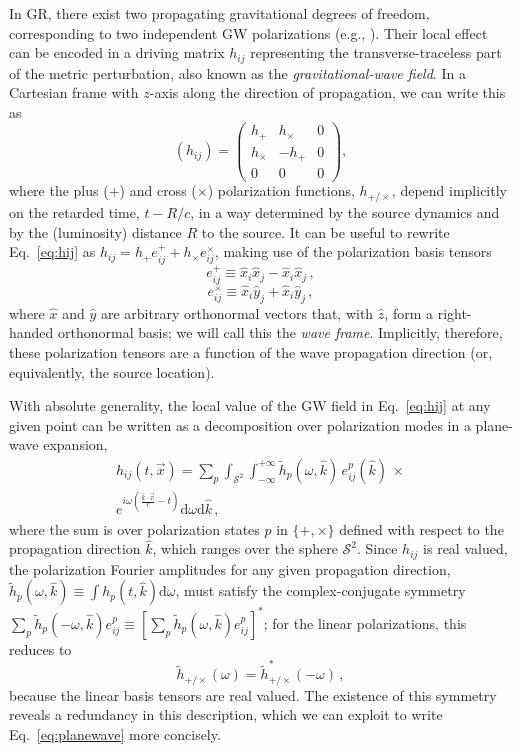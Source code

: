 \documentclass[aps,prd,twocolumn,superscriptaddress,preprintnumbers,floatfix,nofootinbib]{revtex4-2}
\newcommand{\beq}{\begin{equation}}
\newcommand{\eeq}{\end{equation}}
\newcommand*{\eq}[1]{Eq.~\eqref{eq:#1}}
\newcommand{\infd}{\mathrm{d}}
\begin{document}
In GR, there exist two propagating gravitational degrees of freedom, corresponding to two independent GW polarizations (e.g., \cite{Thorne:1987af}).
Their local effect can be encoded in a driving matrix $h_{ij}$ representing the transverse-traceless part of the metric perturbation, also known as the \emph{gravitational-wave field}.
In a Cartesian frame with $z$-axis along the direction of propagation, we can write this as
\beq \label{eq:hij}
(h_{ij}) = \begin{pmatrix}
h_+ & h_\times  & 0 \\
h_\times  & - h_+ & 0  \\
0 & 0 & 0
\end{pmatrix} ,
\eeq
where the plus ($+$) and cross ($\times$) polarization functions, $h_{+/\times}$, depend implicitly on the retarded time, $t - R/c$, in a way determined by the source dynamics and by the (luminosity) distance $R$ to the source.
It can be useful to rewrite \eq{hij} as $h_{ij} = h_+ e^+_{ij} + h_\times e^\times_{ij}$, making use of the polarization basis tensors
\beq
e^+_{ij} \equiv \hat{x}_i \hat{x}_j - \hat{x}_i \hat{x}_j \, ,
\eeq
\beq
e^\times_{ij} \equiv \hat{x}_i \hat{y}_j + \hat{x}_i \hat{y}_j\, ,
\eeq
where $\hat{x}$ and $\hat{y}$ are arbitrary orthonormal vectors that, with $\hat{z}$, form a right-handed orthonormal basis; we will call this the \emph{wave frame}.
Implicitly, therefore, these polarization tensors are a function of the wave propagation direction (or, equivalently, the source location).

With absolute generality, the local value of the GW field in Eq.~\eqref{eq:hij} at any given point can be written as a decomposition over polarization modes in a plane-wave expansion,
\begin{align} \label{eq:planewave}
h_{ij}(t,\vec{x}) = \sum_p \int_{\mathcal{S}^2} \int_{-\infty}^{+\infty} \tilde{h}_p(\omega, \hat{k})\, e^p_{ij}(\hat{k})\, \times\nonumber \\
e^{i\omega \left(\frac{\hat{k}\cdot\vec{x}}{c}-t\right)} \infd \omega \infd \hat{k} \, ,
\end{align}
where the sum is over polarization states $p$ in $\{+,\times\}$ defined with respect to the propagation direction $\hat{k}$, which ranges over the sphere $\mathcal{S}^2$.
Since $h_{ij}$ is real valued, the polarization Fourier amplitudes for any given propagation direction, $\tilde{h}_p(\omega, \hat{k}) \equiv \int h_p(t, \hat{k}) \infd \omega$, must  satisfy the complex-conjugate symmetry $\sum_p \tilde{h}_p(-\omega, \hat{k}) e^p_{ij} \equiv \left[\sum_p \tilde{h}_p(\omega, \hat{k}) e^p_{ij}\right]^*$; for the linear polarizations, this reduces to
\beq \label{eq:sym_linear}
\tilde{h}_{+/\times}(\omega) = \tilde{h}_{+/\times}^*(-\omega)\, ,
\eeq
because the linear basis tensors are real valued.
The existence of this symmetry reveals a redundancy in this description, which we can exploit to write Eq.~\eqref{eq:planewave} more concisely.
\end{document}
